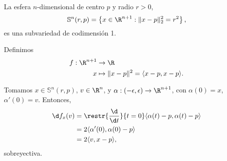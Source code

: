 \begin{ejemplo}
  La esfera $n$-dimensional de centro $p$ y radio $r>0$,
  \[
    \mathbb{S}^{n}(r,p) = \left\{ x\in\R^{n+1} : \|x-p\|_{2}^{2} = r^{2} \right\}
  ,\] es una subvariedad de codimensión 1.

    Definimos
      \begin{alignat*}{2}
      f: \R^{n+1} & \to  \R \\
          x & \mapsto  \|x-p\|^{2} = \langle x-p,x-p \rangle.
      \end{alignat*}

    Tomamos $x\in\mathbb{S}^{n}(r,p)$, $v\in\R^{n}$, y $\alpha:
    (-\epsilon,\epsilon)\to\R^{n+1}$, con $\alpha(0)=x$, $\alpha'(0) = v$.
    Entonces,
      \begin{align*}
      \d f_{x}(v) &= \restr{\frac{\d}{\d t}}{t=0} \langle \alpha(t) -
                    p,\alpha(t) - p \rangle \\
                  &= 2\langle \alpha'(0), \alpha(0) - p \rangle \\
        &= 2\langle v, x-p \rangle,
      \end{align*}
  sobreyectiva.
\end{ejemplo}

